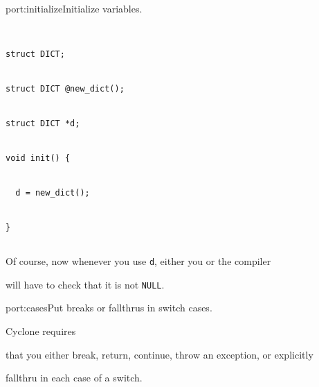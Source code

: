 \begin{porta}{port:initialize}{Initialize variables.}
\begin{verbatim}


struct DICT; 


struct DICT @new_dict();


struct DICT *d;


void init() {


  d = new_dict();


}


\end{verbatim}


Of course, now whenever you use \texttt{d}, either you or the compiler


will have to check that it is not \texttt{NULL}.


\end{porta}





\begin{porta}{port:cases}{Put breaks or fallthrus in switch cases.}  





Cyclone requires


that you either break, return, continue, throw an exception, or explicitly


fallthru in each case of a switch.  


\end{porta}





